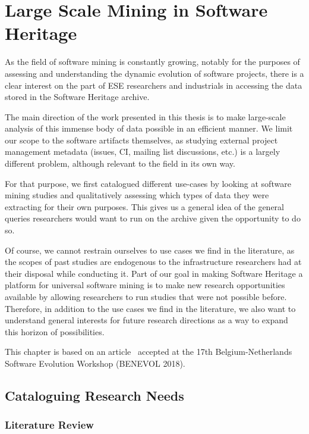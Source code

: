 \chapter{Large Scale Mining in Software Heritage}

As the field of software mining is constantly growing, notably for the purposes
of assessing and understanding the dynamic evolution of software projects,
there is a clear interest on the part of \gls{ESE} researchers and industrials
in accessing the data stored in the Software Heritage archive.

The main direction of the work presented in this thesis is to make large-scale
analysis of this immense body of data possible in an efficient manner. We limit
our scope to the software artifacts themselves, as studying external project
management metadata (issues, \acrshort{CI}, mailing list discussions, etc.) is
a largely different problem, although relevant to the field in its own way.

For that purpose, we first catalogued different use-cases by looking at
software mining studies and qualitatively assessing which types of data they
were extracting for their own purposes. This gives us a general idea of the
general queries researchers would want to run on the archive given the
opportunity to do so.

Of course, we cannot restrain ourselves to use cases we find in the literature,
as the scopes of past studies are endogenous to the infrastructure researchers
had at their disposal while conducting it. Part of our goal in making Software
Heritage a platform for universal software mining is to make new research
opportunities available by allowing researchers to run studies that were not
possible before. Therefore, in addition to the use cases we find in the
literature, we also want to understand general interests for future research
directions as a way to expand this horizon of possibilities.

\vspace{0.5cm}

This chapter is based on an article~\cite{swh-benevol2018-universal-analysis}
accepted at the 17th Belgium-Netherlands Software Evolution Workshop (BENEVOL
2018).

\section{Cataloguing Research Needs}

\subsection{Literature Review}

